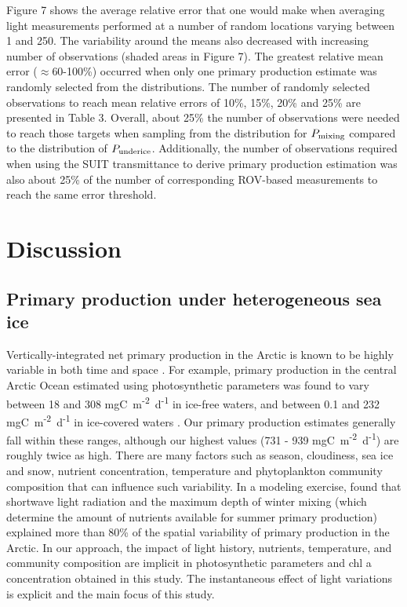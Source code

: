 \documentclass[draft]{agujournal2018}
\newcommand{\ppmixing}{\ensuremath{P_{\textnormal{\scriptsize mixing}}}}
\newcommand{\ppunderice}{\ensuremath{P_{\textnormal{\scriptsize underice}}}}
\newcommand{\dailypp}{mgC~m\textsuperscript{-2}~d\textsuperscript{-1}}
\begin{document}
Figure 7 shows the average relative error that one would make when averaging light measurements performed at a number of random locations varying between 1 and 250. The variability around the means also decreased with increasing number of observations (shaded areas in Figure 7). The greatest relative mean error ($\approx$60-100\%) occurred when only one primary production estimate was randomly selected from the distributions. The number of randomly selected observations to reach mean relative errors of 10\%, 15\%, 20\% and 25\% are presented in Table 3. Overall, about 25\% the number of observations were needed to reach those targets when sampling from the distribution for \ppmixing{} compared to the distribution of \ppunderice{}. Additionally, the number of observations required when using the SUIT transmittance to derive primary production estimation was also about 25\% of the number of corresponding ROV-based measurements to reach the same error threshold.

\section{Discussion}

\subsection{Primary production under heterogeneous sea ice}

Vertically-integrated net primary production in the Arctic is known to be highly variable in both time and space \citep{Matrai2013, Hill2018a}. For example, primary production in the central Arctic Ocean estimated using photosynthetic parameters was found to vary between 18 and 308 \dailypp{} in ice-free waters, and between 0.1 and 232 \dailypp{} in ice-covered waters \citep{Fernandez-Mendez2015}. Our primary production estimates generally fall within these ranges, although our highest values (731 - 939 \dailypp{}) are roughly twice as high. There are many factors such as season, cloudiness, sea ice and snow, nutrient concentration, temperature and phytoplankton community composition that can influence such variability. In a modeling exercise, \citet{Popova2010} found that shortwave light radiation and the maximum depth of winter mixing (which determine the amount of nutrients available for summer primary production) explained more than 80\% of the spatial variability of primary production in the Arctic. In our approach, the impact of light history, nutrients, temperature, and community composition are implicit in photosynthetic parameters and chl a concentration obtained in this study. The instantaneous effect of light variations is explicit and the main focus of this study. 
\end{document}
